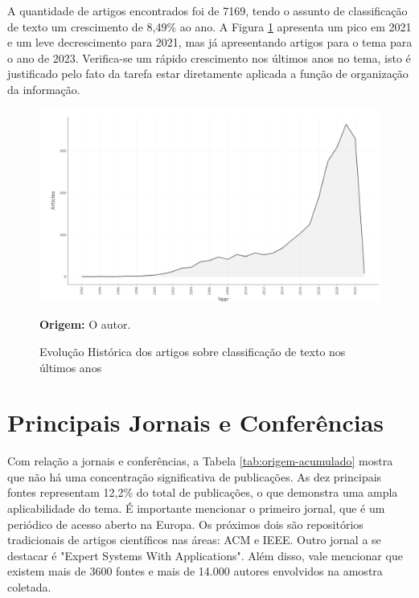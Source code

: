 A quantidade de artigos encontrados foi de 7169, tendo o assunto de classificação de texto um crescimento de 8,49\% ao ano.  A Figura \ref{fig:historicotexto} apresenta um pico em 2021 e um leve decrescimento para 2021, mas já apresentando artigos para o tema para o ano de 2023. Verifica-se um rápido crescimento nos últimos anos no tema, isto é justificado pelo fato da tarefa estar diretamente aplicada a função de organização da informação.  

\begin{figure}[htb]
    \caption{Evolução Histórica dos artigos sobre classificação de texto nos últimos anos}
    \begin{center}    
    \includegraphics[scale=0.3]{images/evolucaoclassificacao.png}
    \label{fig:historicotexto}
    \end{center}
     \small\textbf{Origem:}  O autor.
\end{figure}

\section{Principais Jornais e Conferências}

Com relação a jornais e conferências, a Tabela \ref{tab:origem-acumulado} mostra que não há uma concentração significativa de publicações. As dez principais fontes representam 12,2\% do total de publicações, o que demonstra uma ampla aplicabilidade do tema. É importante mencionar o primeiro jornal, que é um periódico de acesso aberto na Europa. Os próximos dois são repositórios tradicionais de artigos científicos nas áreas: ACM e IEEE. Outro jornal a se destacar é "Expert Systems With Applications". Além disso, vale mencionar que existem mais de 3600 fontes e mais de 14.000 autores envolvidos na amostra coletada.

